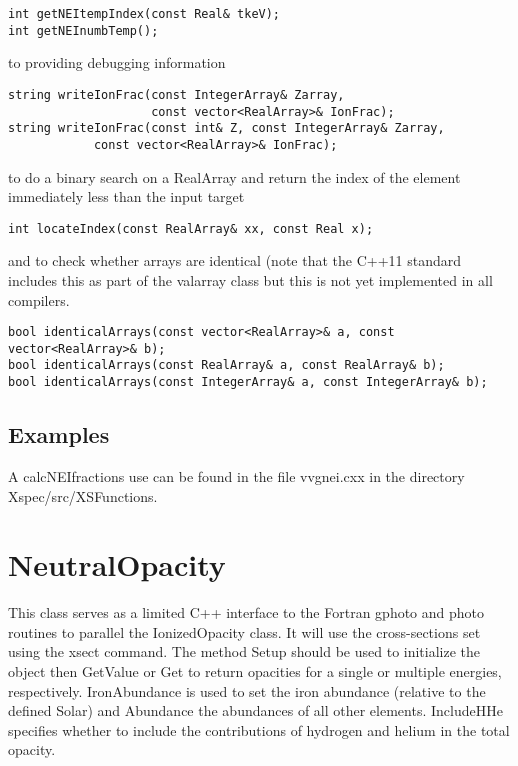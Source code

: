 \documentclass[11pt]{book}
\begin{document}
\begin{verbatim}
int getNEItempIndex(const Real& tkeV);
int getNEInumbTemp();
\end{verbatim}

to providing debugging information

\begin{verbatim}
string writeIonFrac(const IntegerArray& Zarray, 
                    const vector<RealArray>& IonFrac);
string writeIonFrac(const int& Z, const IntegerArray& Zarray, 
		    const vector<RealArray>& IonFrac);
\end{verbatim}

to do a binary search on a RealArray and return the index of
the element immediately less than the input target

\begin{verbatim}
int locateIndex(const RealArray& xx, const Real x);
\end{verbatim}

and to check whether arrays are identical (note that the C++11
standard includes this as part of the valarray class but this is not
yet implemented in all compilers.

\begin{verbatim}
bool identicalArrays(const vector<RealArray>& a, const vector<RealArray>& b);
bool identicalArrays(const RealArray& a, const RealArray& b);
bool identicalArrays(const IntegerArray& a, const IntegerArray& b);
\end{verbatim}


\section{Examples}

A calcNEIfractions use can be found in the file 
vvgnei.cxx in the directory Xspec/src/XSFunctions.

\chapter{NeutralOpacity}

This class serves as a limited C++ interface to the Fortran gphoto and
photo routines to parallel the IonizedOpacity class. It will use the
cross-sections set using the xsect command. The method Setup should be
used to initialize the object then GetValue or Get to return opacities
for a single or multiple energies, respectively. IronAbundance is used
to set the iron abundance (relative to the defined Solar) and
Abundance the abundances of all other elements. IncludeHHe specifies
whether to include the contributions of hydrogen and helium in
the total opacity. 
\end{document}
